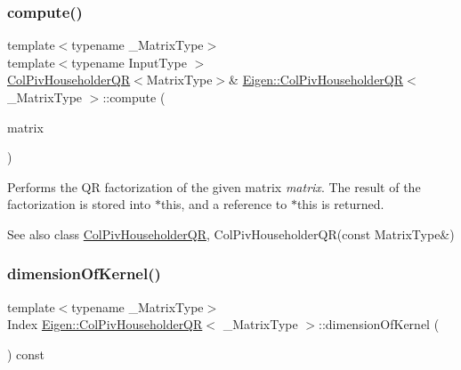 \subsubsection{\texorpdfstring{compute()}{compute()}}
{\footnotesize\ttfamily template$<$typename \+\_\+\+Matrix\+Type$>$ \\
template$<$typename Input\+Type $>$ \\
\mbox{\hyperlink{class_eigen_1_1_col_piv_householder_q_r}{Col\+Piv\+Householder\+QR}}$<$Matrix\+Type$>$\& \mbox{\hyperlink{class_eigen_1_1_col_piv_householder_q_r}{Eigen\+::\+Col\+Piv\+Householder\+QR}}$<$ \+\_\+\+Matrix\+Type $>$\+::compute (\begin{DoxyParamCaption}\item[{const \mbox{\hyperlink{struct_eigen_1_1_eigen_base}{Eigen\+Base}}$<$ Input\+Type $>$ \&}]{matrix }\end{DoxyParamCaption})}

Performs the QR factorization of the given matrix {\itshape matrix}. The result of the factorization is stored into {\ttfamily $\ast$this}, and a reference to {\ttfamily $\ast$this} is returned.

\begin{DoxySeeAlso}{See also}
class \mbox{\hyperlink{class_eigen_1_1_col_piv_householder_q_r}{Col\+Piv\+Householder\+QR}}, Col\+Piv\+Householder\+Q\+R(const Matrix\+Type\&) 
\end{DoxySeeAlso}
\mbox{\label{class_eigen_1_1_col_piv_householder_q_r_a7c9294565d179226133770160b827be1}} 
\subsubsection{\texorpdfstring{dimensionOfKernel()}{dimensionOfKernel()}}
{\footnotesize\ttfamily template$<$typename \+\_\+\+Matrix\+Type$>$ \\
Index \mbox{\hyperlink{class_eigen_1_1_col_piv_householder_q_r}{Eigen\+::\+Col\+Piv\+Householder\+QR}}$<$ \+\_\+\+Matrix\+Type $>$\+::dimension\+Of\+Kernel (\begin{DoxyParamCaption}{ }\end{DoxyParamCaption}) const\hspace{0.3cm}{\ttfamily [inline]}}

